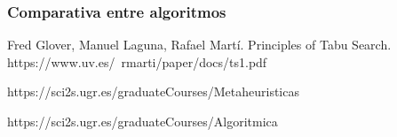 \documentclass{article}
\begin{document}
		\subsubsection{Comparativa entre algoritmos}
			
			
	


	\begin{thebibliography}{0}
		
		 Fred Glover, Manuel Laguna, Rafael Martí. Principles of Tabu Search. https://www.uv.es/~rmarti/paper/docs/ts1.pdf
		
		 https://sci2s.ugr.es/graduateCourses/Metaheuristicas
		
		https://sci2s.ugr.es/graduateCourses/Algoritmica
		
	\end{thebibliography}
\end{document}
